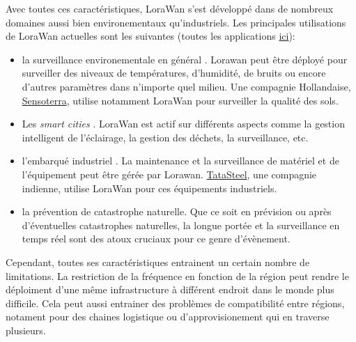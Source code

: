 \vspace{0.1cm}

Avec toutes ces caractéristiques, LoraWan s'est développé dans de nombreux domaines aussi bien environementaux qu'industriels. Les principales utilisations de LoraWan actuelles sont les suivantes (toutes les applications \href{https://www.semtech.com/lora/lora-applications}{ici}):

\vspace{0.1cm}

\begin{itemize}

\item la surveillance environementale en général \cite{lorauc1}. Lorawan peut être déployé pour surveiller des niveaux de températures, d'humidité, de bruits ou encore d'autres paramètres dans n'importe quel milieu. Une compagnie Hollandaise, \href{https://www.sensoterra.com/technology/global-lorawan-networks/}{Sensoterra}, utilise notamment LoraWan pour surveiller la qualité des sols.
\item Les \textit{smart cities} \cite{lorauc2}. LoraWan est actif sur différents aspects comme la gestion intelligent de l'éclairage, la gestion des déchets, la surveillance, etc.
\item l'embarqué industriel \cite{lorauc3}. La maintenance et la surveillance de matériel et de l'équipement peut être gérée par Lorawan. \href{https://consulting.tatasteel.com/our_expertise/plant-infrastructure-and-logistics/}{TataSteel}, une compagnie indienne, utilise LoraWan pour ces équipements industriels.
\item la prévention de catastrophe naturelle. Que ce soit en prévision\cite{lorauc41} ou après\cite{lorauc43} d'éventuelles catastrophes naturelles, la longue portée et la surveillance en temps réel sont des atoux cruciaux pour ce genre d'évènement.
\end{itemize}

\vspace{0.1cm}

Cependant, toutes ses caractéristiques entrainent un certain nombre de limitations. La restriction de la fréquence en fonction de la région peut rendre le déploiment d'une même infrastructure à différent endroit dans le monde plus difficile. Cela peut aussi entrainer des problèmes de compatibilité entre régions, notament pour des chaines logistique ou d'approvisionement qui en traverse plusieurs.

\vspace{0.1cm}

